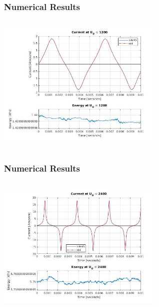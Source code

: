 \documentclass[aspectratio=1610]{beamer}
\begin{document}
\begin{frame}
\frametitle{Numerical Results}
\begin{columns}
\column{37em}
\centerline{\vspace*{2cm}\includegraphics[width=8cm]{figs/1200V + E.jpg}}
\end{columns}
\end{frame}
\begin{frame}
\frametitle{Numerical Results}
\begin{columns}
\column{37em}
\centerline{\vspace*{2cm}\includegraphics[width=8cm]{figs/2400V + E.jpg}}
\end{columns}
\end{frame}
\
\end{document}
